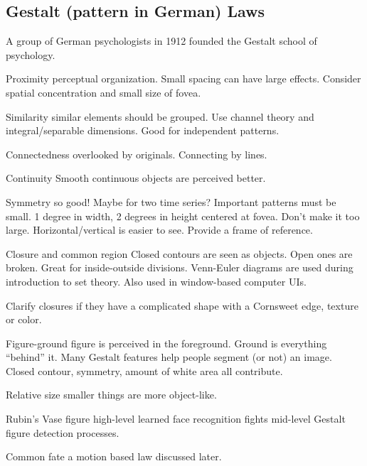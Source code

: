 \begin{mdframed}\begin{multicols}{2}
    \subsection{Gestalt (pattern in German) Laws}
    A group of German psychologists in 1912 founded the Gestalt school of
    psychology.


    \begin{compactdesc}
        \item[Proximity] perceptual organization. Small spacing can have large
            effects. Consider spatial concentration and small size of fovea.
        \item[Similarity] similar elements should be grouped. Use channel theory
            and integral/separable dimensions. Good for independent patterns.
        \item[Connectedness] overlooked by originals. Connecting by lines.
        \item[Continuity] Smooth continuous objects are perceived better.
        \item[Symmetry] so good! Maybe for two time series? Important patterns
            must be small. 1 degree in width, 2 degrees in height centered at
            fovea. Don't make it too large. Horizontal/vertical is easier to
            see. Provide a frame of reference.
        \item[Closure and common region] Closed contours are seen as objects.
            Open ones are broken. Great for inside-outside divisions.
            Venn-Euler diagrams are used during introduction to set theory.
            Also used in window-based computer UIs.
        \item[Clarify closures] if they have a complicated shape with
            a Cornsweet edge, texture or color.
        \item[Figure-ground] figure is perceived in the foreground.
            Ground is everything ``behind'' it. Many Gestalt features help
            people segment (or not) an image. Closed contour, symmetry,
            amount of white area all contribute.
        \item[Relative size] smaller things are more object-like.
        \item[Rubin's Vase figure] high-level learned face recognition fights
            mid-level Gestalt figure detection processes.
        \item[Common fate] a motion based law discussed later.

\end{compactdesc}
\end{multicols}
\end{mdframed}
